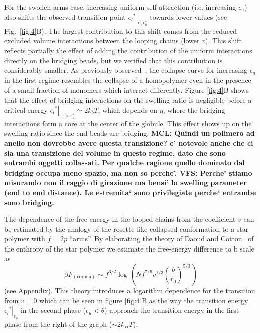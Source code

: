 \documentclass[
preprint,
a4paper,
12pt,
superscriptaddress,
pre]{revtex4}
\begin{document}
For the swollen arms case, increasing uniform self-attraction
(i.e. increasing $\epsilon_u$) also shifts the observed transition
point $\left.{\epsilon_l}^*\right|_{\epsilon_ > \epsilon_u^*}$ towards
lower values (see Fig.~\ref{fig:4}B).  The largest contribution to
this shift comes from the reduced excluded volume interactions between
the looping chains (lower $v$). This shift reflects partially the
effect of adding the contribution of the uniform interactions directly
on the bridging beads, but we verified that this contribution is
considerably smaller.
As previously observed~\cite{Dasmahapatra2006}, the collapse curve for
increasing $\epsilon_u$ in the first regime resembles the collapse of
a homopolymer even in the presence of a small fraction of monomers
which interact differently. Figure \ref{fig:4}B shows that the effect
of bridging interactions on the swelling ratio is negligible before a
critical energy $\left.{\epsilon_l}^*\right|_{\epsilon_u >
  \epsilon_u^*} \simeq 2k_bT$, which depends on $\eta$, where the
bridging interactions form a core at the center of the globule. This
effect shows up on the swelling ratio since the end beads are
bridging.
\textbf{MCL: Quindi un polimero ad anello non dovrebbe avere questa
  transizione?  e' notevole anche che ci sia una transizione del
  volume in questo regime, dato che sono entrambi oggetti
  collassati. Per qualche ragione quello dominato dal bridging occupa
  meno spazio, ma non so perche'. VFS: Perche' stiamo misurando non il
  raggio di girazione  ma bensi' lo swelling parameter (end to end
  distance). Le estremita` sono privilegiate perche` entrambe sono
  bridging. }


The dependence of the free energy in the looped chains from the
coefficient $v$ can be estimated by the analogy of the rosette-like
collapsed conformation to a star polymer with $f = 2 p$ ``arms''. By
elaborating the theory of Daoud and Cotton~\cite{Daoud1982} of the
enthropy of the star polymer we estimate the free-energy difference to
b scale as
\begin{equation}
\beta F_\mathrm{(corona)} \sim f^{3/2} \log\left(Nf^{7/6} v^{1/3}
  \left( \frac{b}{r_0}\right)^{5/3} \right)
\label{eq:corona}
\end{equation}
(see Appendix). This theory introduces a logarithm dependence for the
transition from $v = 0$ which can be seen in figure \ref{fig:4}B as
the way the transition energy
$\left.{\epsilon_l}^*\right|_{\epsilon_u}$ in the second phase
($\epsilon_u < \theta$) approach the transition energy in the first
phase from the right of the graph ($\sim 2 k_B T$).  
\end{document}
